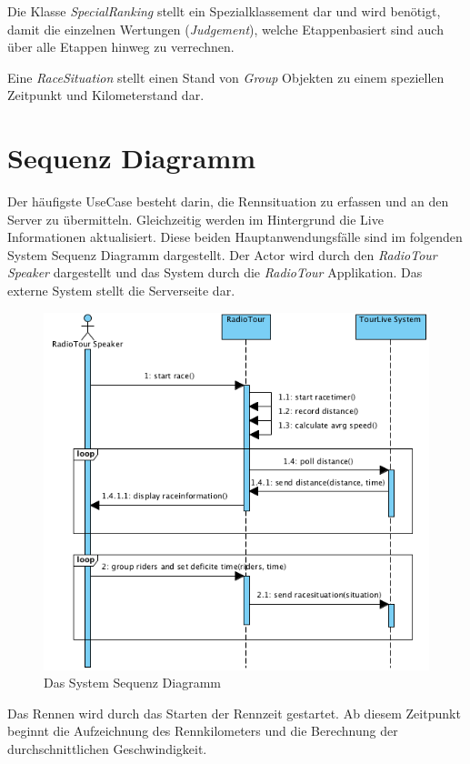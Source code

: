 Die Klasse \textit{SpecialRanking} stellt ein Spezialklassement dar und wird benötigt, damit die einzelnen Wertungen (\textit{Judgement}), welche Etappenbasiert sind auch über alle Etappen hinweg zu verrechnen.

Eine \textit{RaceSituation} stellt einen Stand von \textit{Group} Objekten zu einem speziellen Zeitpunkt und Kilometerstand dar.

\section{Sequenz Diagramm}
Der häufigste UseCase besteht darin, die Rennsituation zu erfassen und an den Server zu übermitteln. Gleichzeitig werden im Hintergrund die Live Informationen aktualisiert. Diese beiden Hauptanwendungsfälle sind im folgenden System Sequenz Diagramm dargestellt. Der Actor wird durch den \textit{RadioTour Speaker} dargestellt und das System durch die \textit{RadioTour} Applikation. Das externe System stellt die Serverseite dar.

\begin{figure}[h!]
\caption{Das System Sequenz Diagramm}
\label{fig:ssd_rennen}
\centering
\includegraphics{05bericht/images/ssd_rennen.png}
\end{figure} 

Das Rennen wird durch das Starten der Rennzeit gestartet. Ab diesem Zeitpunkt beginnt die Aufzeichnung des Rennkilometers und die Berechnung der durchschnittlichen Geschwindigkeit.


